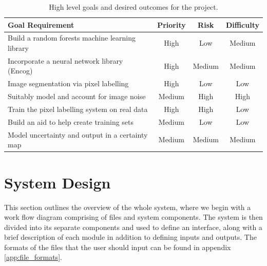 \documentclass[12pt,twoside,notitlepage]{report}
\begin{document}
        \begin{table}[H]
            \begin{minipage}{\textwidth}
                \begin{tabular}{lccc}
                    \hline 
                        \textbf{Goal Requirement} & \textbf{Priority} & \textbf{Risk} & \textbf{Difficulty} \\
                    \hline 
                        Build a random forests machine learning library       & High      & Low         & Medium    \\
                        Incorporate a neural network library (Encog)          & High      & Medium      & Medium    \\
                        Image segmentation via pixel labelling                & High      & Low         & Low       \\
                        Suitably model and account for image noise            & Medium    & High        & High      \\ 
                        Train the pixel labelling system on real data         & High      & High        & Low       \\
                        Build an aid to help create training sets             & Medium    & Low         & Low       \\
                        Model uncertainty and output in a certainty map       & Medium    & Medium      & Medium    \\
                    \hline  
                \end{tabular}
            \end{minipage}
            \caption{High level goals and desired outcomes for the project.}
        \end{table}


    \section{System Design}
        This section outlines the overview of the whole system, where we begin with a work flow diagram comprising of 
        files and system components. The system is then divided into its separate components and used to define an 
        interface, along with a brief description of each module in addition to defining inputs and outputs. The formats of the files 
        that the user should input can be found in appendix \ref{app:file_formats}.
\end{document}
